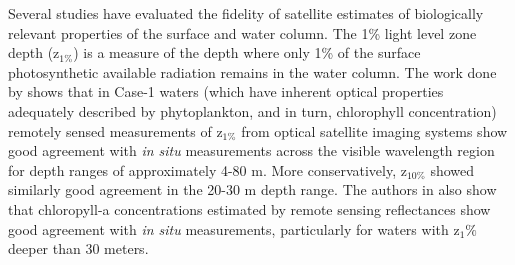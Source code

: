 \documentclass[10pt,letterpaper]{article}
\begin{document}
Several studies have evaluated the fidelity of satellite estimates of biologically relevant properties of the surface and water column. The 1\% light level zone depth (z$_{1\%}$) is a measure of the depth where only 1\% of the surface photosynthetic available radiation remains in the water column. The work done by \cite{lee2007euphotic} shows that in Case-1 waters (which have inherent optical properties adequately described by phytoplankton, and in turn, chlorophyll concentration) remotely sensed measurements of z$_{1\%}$ from optical satellite imaging systems show good agreement with \emph{in situ} measurements across the visible wavelength region for depth ranges of approximately 4-80 m. More conservatively, z$_{10\%}$ showed similarly good agreement in the 20-30 m depth range. The authors in \cite{lee2007euphotic} also show that chloropyll-a concentrations estimated by remote sensing reflectances show good agreement with \emph{in situ} measurements, particularly for waters with z$_1\%$ deeper than 30 meters.
\end{document}
